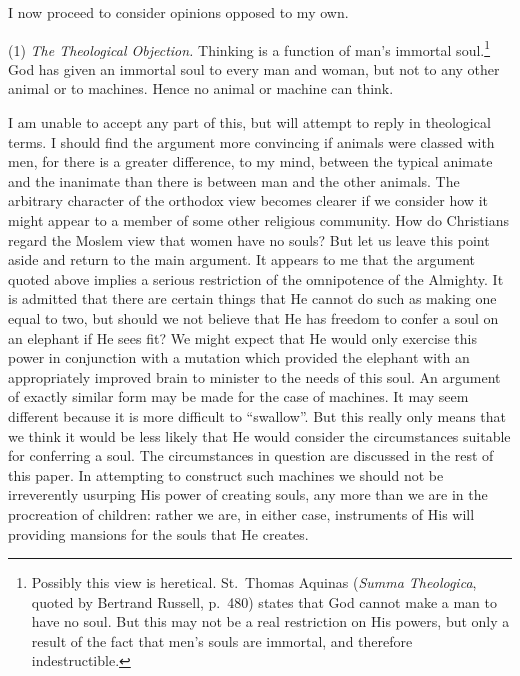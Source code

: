 \documentclass[10pt]{article} %
\begin{document}
I now proceed to consider opinions opposed to my own.
\vspace{0.5\baselineskip} %

\noindent\normalfont (1) \textit{The Theological Objection.} Thinking is a function of man's immortal soul.\footnote{\normalfont\tiny Possibly this view is heretical. St.~Thomas Aquinas (\textit{Summa Theologica}, quoted by Bertrand Russell, p.~480) states that God cannot make a man to have no soul. But this may not be a real restriction on His powers, but only a result of the fact that men's souls are immortal, and therefore indestructible.} God has given an immortal soul to every man and woman, but not to any other animal or to machines. Hence no animal or machine can think.

I am unable to accept any part of this, but will attempt to reply in theological terms. I should find the argument more convincing if animals were classed with men, for there is a greater difference, to my mind, between the typical animate and the inanimate than there is between man and the other animals. The arbitrary character of the orthodox view becomes clearer if we consider how it might appear to a member of some other religious community. How do Christians regard the Moslem view that women have no souls? But let us leave this point aside and return to the main argument. It appears to me that the argument quoted above implies a serious restriction of the omnipotence of the Almighty. It is admitted that there are certain things that He cannot do such as making one equal to two, but should we not believe that He has freedom to confer a soul on an elephant if He sees fit? We might expect that He would only exercise this power in conjunction with a mutation which provided the elephant with an appropriately improved brain to minister to the needs of this soul. An argument of exactly similar form may be made for the case of machines. It may seem different because it is more difficult to ``swallow''. But this really only means that we think it would be less likely that He would consider the circumstances suitable for conferring a soul. The circumstances in question are discussed in the rest of this paper. In attempting to construct such machines we should not be irreverently usurping His power of creating souls, any more than we are in the procreation of children: rather we are, in either case, instruments of His will providing mansions for the souls that He creates.
\end{document}
